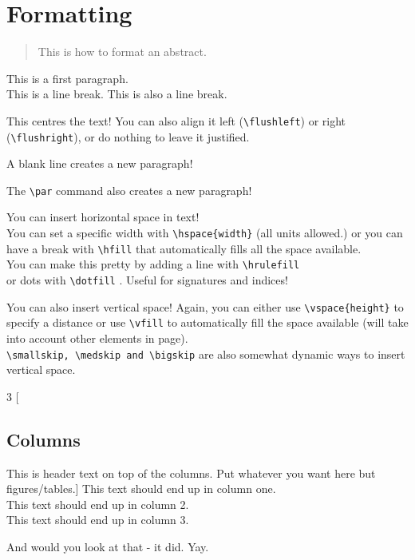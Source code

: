 \documentclass[12pt, letterpaper]{article} %
\begin{document}
\clearpage %

\section{Formatting}

\begin{abstract}
	This is how to format an abstract.
\end{abstract}

This is a first paragraph.\\
This is a line break.\newline
This is also a line break. %

\begin{center}
	This centres the text! You can also align it left (\verb+\flushleft+) 
	or right (\verb+\flushright+), or do nothing to leave it justified.
	
	A blank line creates a new paragraph!\par
	The \verb+\par+ command also creates a new paragraph!
\end{center}

You can insert horizontal space in text! \\
You can set a specific width with \verb+\hspace{width}+ \hspace{1cm} (all units 
allowed.)
or you can have a break with \verb+\hfill+ that automatically \hfill 
fills all the space available. \\ 
You can make this pretty by adding a line with \verb+\hrulefill+ \hrulefill \\
or dots with \verb+\dotfill+ \dotfill. Useful for signatures and indices!

You can also insert vertical space! 
Again, you can either use \verb+\vspace{height}+ to \vspace{5mm} \\
specify a distance or use \verb+\vfill+ to automatically \vfill fill the space 
available 
(will take into account other elements in page). \\  
\verb+\smallskip, \medskip and \bigskip+ are also 
somewhat dynamic ways to insert vertical space.

\begin{multicols}{3} %
	[\subsection*{Columns}
	This is header text on top of the columns. 
	Put whatever you want here but figures/tables.]
	This text should end up in column one. \\ 
	This text should end up in column 2. \\ 
	This text should end up in column 3.
\end{multicols}
And would you look at that - it did. Yay.
\end{document}
